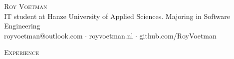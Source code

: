 \documentclass[a4paper]{article}
\newcommand{\lineunder} {
    \vspace*{-8pt} \\
    \hspace*{-18pt} \hrulefill \\
}
\newcommand{\header} [1] {
    {\hspace*{-18pt}\vspace*{6pt} \textsc{#1}}
    \vspace*{-6pt} \lineunder
}
\begin{document}
\vspace*{-40pt}

    

\vspace*{-10pt}
\begin{center}
	{\Huge \scshape {Roy Voetman}}\\
    \vspace*{3pt}
    {IT student at Hanze University of Applied Sciences. Majoring in Software Engineering}\\
    \vspace*{3pt}
	royvoetman@outlook.com $\cdot$ royvoetman.nl $\cdot$ github.com/RoyVoetman\\
\end{center}

\header{Experience}
\vspace{1mm}
\end{document}
